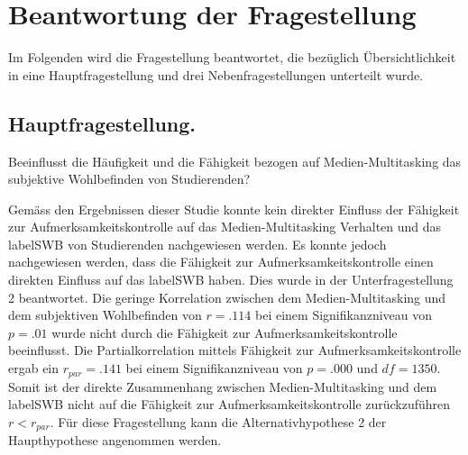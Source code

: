 %
%
\glsresetall
\let\raggedsection\centering
{}
\setcounter{chapter}{4}
\setcounter{section}{0}
\let\raggedsection\raggedright 

\section{Beantwortung der Fragestellung}\label{section.diskussion.fragestellung}
Im Folgenden wird die Fragestellung beantwortet, die bezüglich Übersichtlichkeit in eine Hauptfragestellung und drei Nebenfragestellungen unterteilt wurde. 
\par
\subsection{Hauptfragestellung.} Beeinflusst die Häufigkeit und die Fähigkeit bezogen auf Medien-Multitasking das subjektive Wohlbefinden von Studierenden?
\par
Gemäss den Ergebnissen dieser Studie konnte kein direkter Einfluss der Fähigkeit zur Aufmerksamkeitskontrolle auf das Medien-Multitasking Verhalten und das \gls{labelSWB} von Studierenden nachgewiesen werden. Es konnte jedoch nachgewiesen werden, dass die Fähigkeit zur Aufmerksamkeitskontrolle einen direkten Einfluss auf das \gls{labelSWB} haben. Dies wurde in der Unterfragestellung 2 beantwortet. Die geringe Korrelation zwischen dem Medien-Multitasking und dem subjektiven Wohlbefinden von $r=.114$ bei einem Signifikanzniveau von $p=.01$ wurde nicht durch die Fähigkeit zur Aufmerksamkeitskontrolle beeinflusst. Die Partialkorrelation mittels Fähigkeit zur Aufmerksamkeitskontrolle ergab ein $r_{par}=.141$ bei einem Signifikanzniveau von $p=.000$ und $df=1350$. Somit ist der direkte Zusammenhang zwischen Medien-Multitasking und dem \gls{labelSWB} nicht auf die Fähigkeit zur Aufmerksamkeitskontrolle zurückzuführen $r<r_{par}$. Für diese Fragestellung kann die Alternativhypothese 2 der Haupthypothese angenommen werden.

